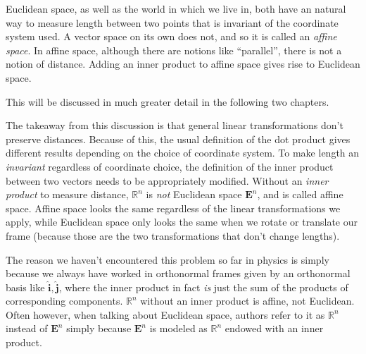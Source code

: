	Euclidean space, as well as the world in which we live in, both have an natural way to measure length between two points that is invariant of the coordinate system used. A vector space on its own does not, and so it is called an \emph{affine space}. In affine space, although there are notions like ``parallel'', there is not a notion of distance. Adding an inner product to affine space gives rise to Euclidean space.
	
	
	This will be discussed in much greater detail in the following two chapters. 
	
	The takeaway from this discussion is that general linear transformations don't preserve distances. Because of this, the usual definition of the dot product gives different results depending on the choice of coordinate system. To make length an \emph{invariant} regardless of coordinate choice, the definition of the inner product between two vectors needs to be appropriately modified. Without an \emph{inner product} to measure distance, $\mathbb{R}^n$ is \emph{not} Euclidean space $\mathbf{E}^n$, and is called affine space. Affine space looks the same regardless of the linear transformations we apply, while Euclidean space only looks the same when we rotate or translate our frame (because those are the two transformations that don't change lengths). 
	
	The reason we haven't encountered this problem so far in physics is simply because we always have worked in orthonormal frames given by an orthonormal basis like $\hat{\mathbf{i}}, \hat{\mathbf{j}}$, where the inner product in fact \emph{is} just the sum of the products of corresponding components. $\mathbb{R}^n$ without an inner product is affine, not Euclidean. Often however, when talking about Euclidean space, authors refer to it as $\mathbb{R}^n$ instead of $\mathbf{E}^n$ simply because $\mathbf{E}^n$ is modeled as $\mathbb{R}^n$ endowed with an inner product.
	
	


